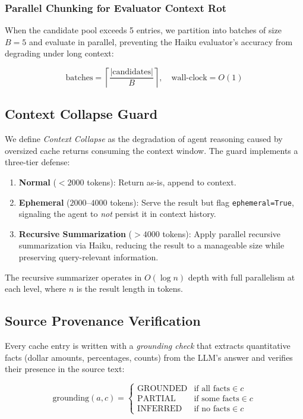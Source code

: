 \documentclass[11pt,twocolumn]{article}
\begin{document}
\subsubsection{Parallel Chunking for Evaluator Context Rot}
When the candidate pool exceeds 5 entries, we partition into batches of size $B=5$ and evaluate in parallel, preventing the Haiku evaluator's accuracy from degrading under long context:

$$\text{batches} = \left\lceil \frac{|\text{candidates}|}{B} \right\rceil, \quad \text{wall-clock} = O(1)$$

\subsection{Context Collapse Guard}
\label{sec:collapse}

We define \textit{Context Collapse} as the degradation of agent reasoning caused by oversized cache returns consuming the context window. The guard implements a three-tier defense:

\begin{enumerate}
    \item \textbf{Normal} ($< 2000$ tokens): Return as-is, append to context.
    \item \textbf{Ephemeral} ($2000$--$4000$ tokens): Serve the result but flag \texttt{ephemeral=True}, signaling the agent to \textit{not} persist it in context history.
    \item \textbf{Recursive Summarization} ($> 4000$ tokens): Apply parallel recursive summarization via Haiku, reducing the result to a manageable size while preserving query-relevant information.
\end{enumerate}

The recursive summarizer operates in $O(\log n)$ depth with full parallelism at each level, where $n$ is the result length in tokens.

\subsection{Source Provenance Verification}
\label{sec:provenance}

Every cache entry is written with a \textit{grounding check} that extracts quantitative facts (dollar amounts, percentages, counts) from the LLM's answer and verifies their presence in the source text:

$$\text{grounding}(a, c) = \begin{cases}
\text{GROUNDED} & \text{if all facts} \in c \\
\text{PARTIAL} & \text{if some facts} \in c \\
\text{INFERRED} & \text{if no facts} \in c
\end{cases}$$
\end{document}
